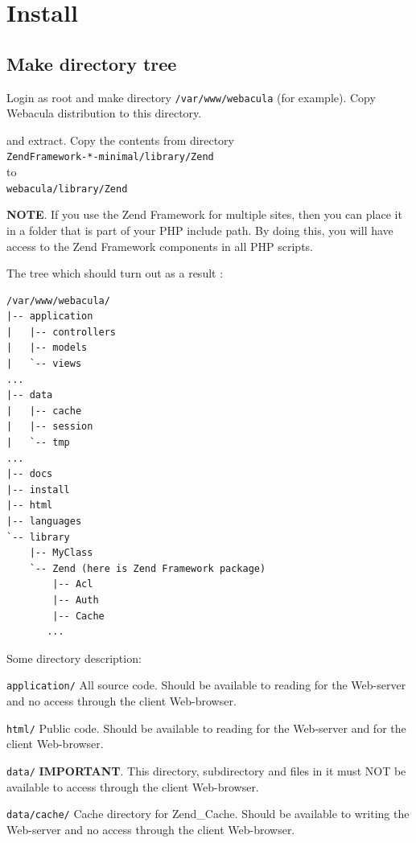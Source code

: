 \documentclass[10pt]{article}
\begin{document}
\section{Install}
\label{Install}



\subsection{Make directory tree}
\label{Install:Make directory tree}

Login as root and make directory \texttt{/var/www/webacula} (for example).
Copy Webacula distribution to this directory.

 and extract.
Copy the contents from directory \\
\texttt{ZendFramework-*-minimal/library/Zend} \\
to \\
\texttt{webacula/library/Zend}

\textbf{NOTE}. If you use the Zend Framework for multiple sites, then you can place it in a folder that is part of
your PHP include path. By doing this, you will have access to the Zend Framework components in all PHP scripts.

The tree which should turn out as a result :

\begin{verbatim}
/var/www/webacula/
|-- application
|   |-- controllers
|   |-- models
|   `-- views
...
|-- data
|   |-- cache
|   |-- session
|   `-- tmp
...
|-- docs
|-- install
|-- html
|-- languages
`-- library
    |-- MyClass
    `-- Zend (here is Zend Framework package)
        |-- Acl
        |-- Auth
        |-- Cache
       ...
\end{verbatim}


Some directory description:

\texttt{application/}    All source code. Should be available to reading for the Web-server and
                  no access through the client Web-browser.

\texttt{html/}    Public code. Should be available to reading for the Web-server and for the client Web-browser.

\texttt{data/}    \textbf{IMPORTANT}. This directory, subdirectory and files in it
                  must NOT be available to access through the client Web-browser.

\texttt{data/cache/}  Cache directory for Zend\_Cache. Should be available to writing the Web-server and
                  no access through the client Web-browser.
\end{document}
